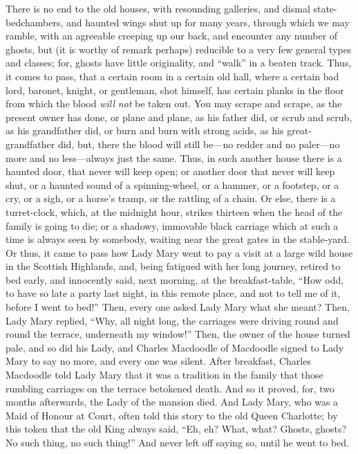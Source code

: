 There is no end to the old houses, with resounding galleries, and
dismal state-bedchambers, and haunted wings shut up for many years,
through which we may ramble, with an agreeable creeping up our back,
and encounter any number of ghosts, but (it is worthy of remark
perhaps) reducible to a very few general types and classes; for,
ghosts have little originality, and ``walk'' in a beaten track.  Thus,
it comes to pass, that a certain room in a certain old hall, where a
certain bad lord, baronet, knight, or gentleman, shot himself, has
certain planks in the floor from which the blood \emph{will} \emph{not} be taken
out.  You may scrape and scrape, as the present owner has done, or
plane and plane, as his father did, or scrub and scrub, as his
grandfather did, or burn and burn with strong acids, as his great-%
grandfather did, but, there the blood will still be---no redder and
no paler---no more and no less---always just the same.  Thus, in such
another house there is a haunted door, that never will keep open; or
another door that never will keep shut, or a haunted sound of a
spinning-wheel, or a hammer, or a footstep, or a cry, or a sigh, or
a horse's tramp, or the rattling of a chain.  Or else, there is a
turret-clock, which, at the midnight hour, strikes thirteen when the
head of the family is going to die; or a shadowy, immovable black
carriage which at such a time is always seen by somebody, waiting
near the great gates in the stable-yard.  Or thus, it came to pass
how Lady Mary went to pay a visit at a large wild house in the
Scottish Highlands, and, being fatigued with her long journey,
retired to bed early, and innocently said, next morning, at the
breakfast-table, ``How odd, to have so late a party last night, in
this remote place, and not to tell me of it, before I went to bed!''
Then, every one asked Lady Mary what she meant?  Then, Lady Mary
replied, ``Why, all night long, the carriages were driving round and
round the terrace, underneath my window!''  Then, the owner of the
house turned pale, and so did his Lady, and Charles Macdoodle of
Macdoodle signed to Lady Mary to say no more, and every one was
silent.  After breakfast, Charles Macdoodle told Lady Mary that it
was a tradition in the family that those rumbling carriages on the
terrace betokened death.  And so it proved, for, two months
afterwards, the Lady of the mansion died.  And Lady Mary, who was a
Maid of Honour at Court, often told this story to the old Queen
Charlotte; by this token that the old King always said, ``Eh, eh?
What, what?  Ghosts, ghosts?  No such thing, no such thing!''  And
never left off saying so, until he went to bed.

